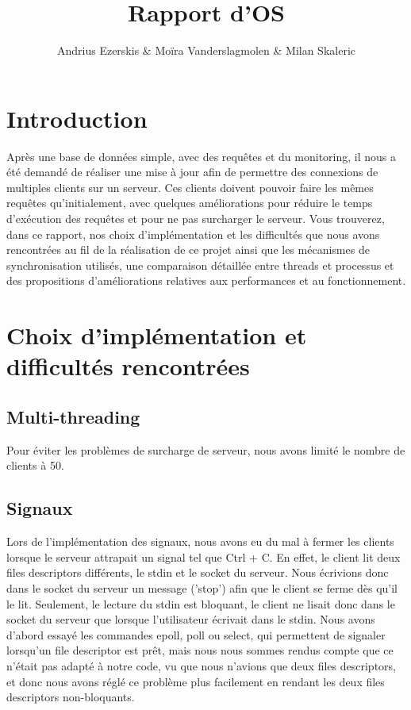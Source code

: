 \documentclass[utf8]{article}
\begin{document}
\begin{titlepage}
    

\author{Andrius Ezerskis \& Moïra Vanderslagmolen \& Milan Skaleric}
\title{Rapport d'OS}

\maketitle
\end{titlepage}

\section{Introduction}
\par

Après une base de données simple, avec des requêtes et du monitoring, il nous a été demandé de réaliser une mise à jour afin de permettre des connexions de multiples clients sur un serveur.\newline
Ces clients doivent pouvoir faire les mêmes requêtes qu'initialement, avec quelques améliorations pour réduire le temps d'exécution des requêtes et pour ne pas surcharger le serveur.
Vous trouverez, dans ce rapport, nos choix d'implémentation et les difficultés que nous avons rencontrées au fil de la réalisation de ce projet ainsi que les mécanismes de synchronisation utilisés, une comparaison
détaillée entre threads et processus et des propositions d'améliorations relatives aux performances et au fonctionnement.
\section{Choix d'implémentation et difficultés rencontrées}
\subsection{Multi-threading}
Pour éviter les problèmes de surcharge de serveur, nous avons limité le nombre de clients à 50.
\subsection{Signaux}
\par
\indent

Lors de l'implémentation des signaux, nous avons eu du mal à fermer les clients lorsque le serveur attrapait un signal tel que Ctrl + C. 
En effet, le client lit deux files descriptors différents, le stdin et le socket du serveur. Nous écrivions donc dans le socket du serveur un message ('stop')
afin que le client se ferme dès qu'il le lit. Seulement, le lecture du stdin est bloquant, le client ne lisait donc dans le socket du serveur que lorsque l'utilisateur
écrivait dans le stdin. 
\newline
Nous avons d'abord essayé les commandes epoll, poll ou select, qui permettent de signaler lorsqu'un file descriptor est prêt, mais nous nous sommes rendus compte que
ce n'était pas adapté à notre code, vu que nous n'avions que deux files descriptors, et donc nous avons réglé ce problème plus facilement en rendant les deux files descriptors non-bloquants.
\par
\end{document}
